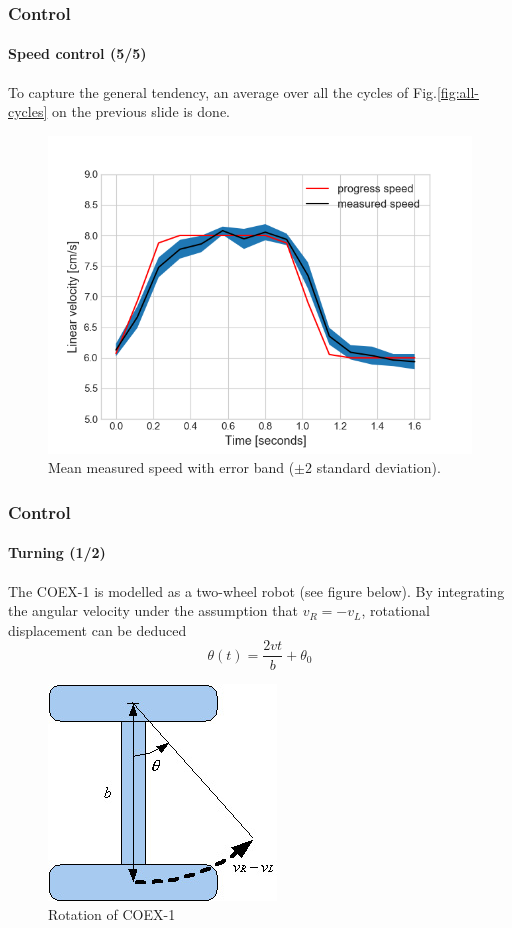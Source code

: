 \documentclass[10pt]{beamer}
\begin{document}
\begin{frame}
\frametitle{Control}
\framesubtitle{Speed control (5/5)}
To capture the general tendency, an average over all the cycles of Fig.\ref{fig:all-cycles} on the previous slide is done. 
\begin{figure}[hbtp]
\centering
\label{fig:average-pid}
\includegraphics[scale=0.45]{figures/pid_speed_shaded.png}
\caption{Mean measured speed with error band ($\pm 2$ standard deviation).}
\end{figure}
\end{frame}


\begin{frame}
\frametitle{Control}
\framesubtitle{Turning (1/2)}
The COEX-1 is modelled as a two-wheel robot (see figure below). By integrating the angular velocity under the assumption that $v_R = -v_L$, rotational displacement can be deduced
\begin{equation}\label{eq:theta-turn}
\theta(t) = \frac{2vt}{b} + \theta_0
\end{equation}
\begin{figure}[hbtp]
\centering
\label{fig:model-turn}
\includegraphics[scale=0.45]{figures/differential-system.jpg}
\caption{Rotation of COEX-1}
\end{figure}
\end{frame}
\end{document}
